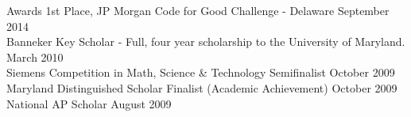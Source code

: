 \documentclass{resume} %
\begin{document}
\begin{rSection}{Awards}
1st Place, JP Morgan Code for Good Challenge - Delaware \hfill{September 2014}\\
Banneker Key Scholar - Full, four year scholarship to the University of Maryland.  \hfill { March 2010}   \\
Siemens Competition in Math, Science \& Technology Semifinalist \hfill {October 2009} \\
Maryland Distinguished Scholar Finalist (Academic Achievement) \hfill {October 2009}  \\
National AP Scholar \hfill {August 2009}  \\

\end{rSection}
\end{document}

